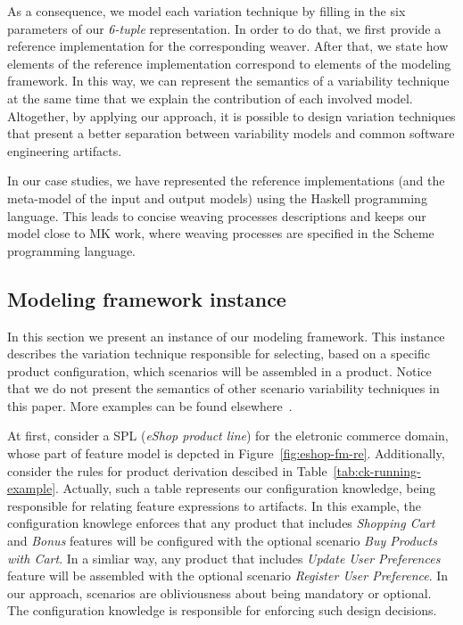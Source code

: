 \documentclass[times, 11pt,twocolumn]{article}
\begin{document}
As a consequence, we model each variation technique by filling in
the six parameters of our \emph{6-tuple} representation. In order to do
that, we first provide a reference implementation for the corresponding
weaver. After that, we state how elements of the reference implementation
correspond to elements of the modeling framework. In this way, we can represent the semantics
of a variability technique at the same time that we explain the contribution of each involved model. 
Altogether, by applying our approach, it is possible to design variation
techniques that present a better separation between variability models and
common software engineering artifacts.

In our case studies, we have represented the reference implementations (and the
meta-model of the input and output models) using the Haskell programming language. 
This leads to concise weaving processes descriptions and keeps our model close
to MK work, where weaving processes are specified in the Scheme programming language. 

\subsection{Modeling framework instance}\label{sub:framework-instance}

In this section we present an instance of our modeling framework. This
instance describes the variation technique responsible for selecting, based on a specific product
configuration, which scenarios will be assembled in a product.
Notice that we do not present the semantics of other scenario
variability techniques in this paper. More examples can be found
elsewhere~\cite{}.

At first, consider a SPL (\emph{eShop product line}) for the eletronic
commerce domain, whose part of feature model is depcted in
Figure~\ref{fig:eshop-fm-re}. Additionally, consider the rules for product derivation descibed in
Table~\ref{tab:ck-running-example}. Actually, such a table
represents our configuration knowledge, being responsible for relating feature
expressions to artifacts. In this example, the configuration knowlege
enforces that any product that includes \emph{Shopping Cart} and
\emph{Bonus} features will be configured with the optional scenario \emph{Buy
Products with Cart}. In a simliar way, any product that includes \emph{Update
User Preferences} feature will be assembled with the optional scenario
\emph{Register User Preference}. In our approach, scenarios are obliviousness
about being mandatory or optional. The configuration knowledge is
responsible for enforcing such design decisions.
\end{document}
